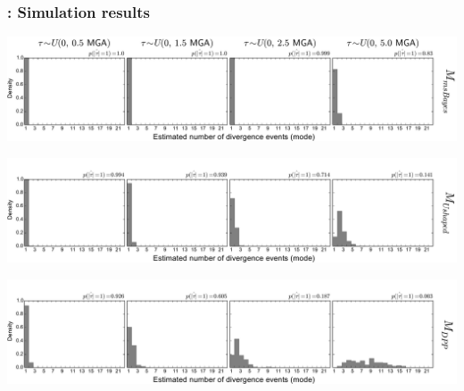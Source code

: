 \begin{frame}[noframenumbering]
    \frametitle{\dppmsbayes: Simulation results}
        \centerline{
        \includegraphics[width=\textwidth]{../images/old_old_power_psi_mode.pdf}}
        \vspace{0mm}
        \centerline{
        \includegraphics[width=\textwidth]{../images/old_u-shaped_power_psi_mode_headless.pdf}}
        \vspace{0mm}
        \centerline{
        \includegraphics[width=\textwidth]{../images/old_dpp_power_psi_mode_headless.pdf}}
\end{frame}


